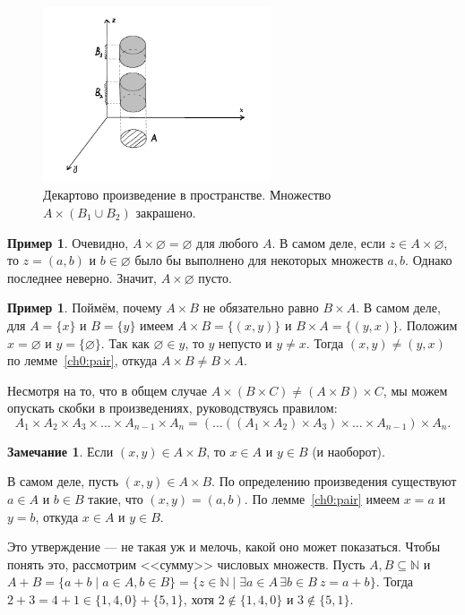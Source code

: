 \documentclass[12pt,notitlepage]{article}
\theoremstyle{plain}
\theoremstyle{definition}
\newtheorem{exm}[thm]{Пример}
\newtheorem{rem}[thm]{Замечание}
\theoremstyle{plain}
\newcommand{\N}{\mathbb{N}}
\newcommand{\sbs}{\subseteq}
\newcommand{\void}{\varnothing}
\newcommand{\1}{\mathbf{1}}
\newcommand{\0}{\mathbf{0}}
\begin{document}
\begin{figure}[h]
	\centering
	\includegraphics*[width=0.6\textwidth]{cart_prod.pdf}
	\caption{Декартово произведение в пространстве. Множество $A \times (B_1 \cup B_2)$ закрашено.}
\end{figure}

\begin{exm}
	Очевидно, $A \times \void = \void$ для любого $A$. В самом деле, если $z \in A \times \void$, то $z = (a,b)$ и $b \in \void$ было бы выполнено для некоторых множеств $a, b$. Однако последнее неверно. Значит, $A \times \void$ пусто.
\end{exm}

\begin{exm}
	Поймём, почему $A \times B$ не обязательно равно $B \times A$. В самом деле, для $A = \{ x \}$ и $B = \{ y \}$ имеем $A \times B = \{(x,y)\}$ и $B \times A = \{(y,x)\}$. Положим $x = \void$ и $y = \{ \void \}$. Так как $\void \in y$, то $y$ непусто и $y \neq x$. Тогда $(x,y) \neq (y,x)$ по лемме~\ref{ch0:pair}, откуда $A \times B \neq B \times A$.
\end{exm}

Несмотря на то, что в общем случае $A \times (B \times C) \neq (A \times B) \times C$, мы можем опускать скобки в произведениях, руководствуясь правилом:
$$A_1 \times A_2 \times A_3 \times \ldots \times A_{n-1} \times A_n = (\ldots ((A_1 \times A_2) \times A_3) \times \ldots \times A_{n-1}) \times A_n.$$


\begin{rem}\label{ch0:pair_uniq}
	Если $(x,y) \in A \times B$, то $x \in A$ и $y \in B$ (и наоборот).
	
	В самом деле, пусть $(x,y) \in A \times B$. По определению произведения существуют $a \in A$ и $b \in B$ такие, что $(x,y) = (a,b)$. По лемме~\ref{ch0:pair} имеем $x = a$ и $y = b$, откуда $x \in A$ и $y \in B$.
	
	Это утверждение --- не такая уж и мелочь, какой оно может показаться. Чтобы понять это, рассмотрим <<сумму>> числовых множеств. Пусть $A, B \sbs \N$ и $A + B = \{ a + b \mid a \in A, b \in B \} = \{z \in \N \mid \exists a \in A\, \exists b \in B\  z = a + b\}$. Тогда $2 + 3 = 4 + 1 \in \{1,4,0\} + \{ 5,1 \}$, хотя $2 \notin \{1,4,0\}$ и $3 \notin \{5, 1\}$. 
\end{rem}
\end{document}
